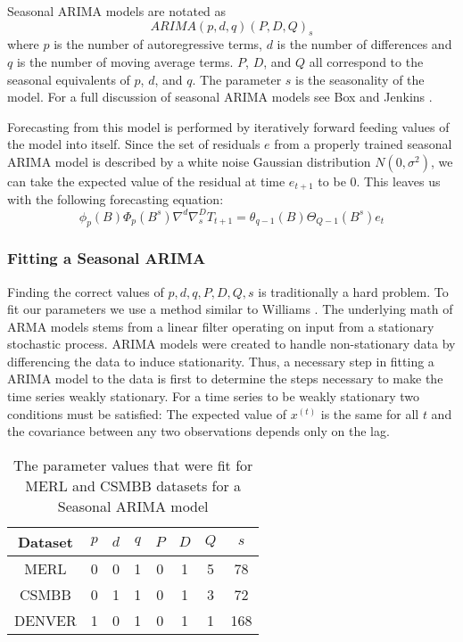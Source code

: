Seasonal ARIMA models are notated as
\begin{equation}
ARIMA(p,d,q)(P,D,Q)_{s}
\end{equation}
where $p$ is the number of autoregressive terms, $d$ is the number of differences and $q$ is the number of moving average terms.  $P$, $D$, and $Q$ all correspond to the seasonal equivalents of $p$, $d$, and $q$.  The parameter $s$ is the seasonality of the model.  For a full discussion of seasonal ARIMA models see Box and Jenkins \cite{Box2008}.

Forecasting from this model is performed by iteratively forward feeding values of the model into itself.  Since the set of residuals $e$ from a properly trained seasonal ARIMA model is described by a white noise Gaussian distribution $N(0, \sigma^{2})$, we can take the expected value of the residual at time $e_{t + 1}$ to be 0.  This leaves us with the following forecasting equation: 
\begin{equation}
\label{eq:sarima}
\phi_{p}(B)\Phi_{p}(B^{s})\nabla^{d}\nabla^{D}_{s}T_{t + 1} = \theta_{q - 1}(B)\Theta_{Q - 1}(B^{s})e_{t}
\end{equation}



\subsubsection{Fitting a Seasonal ARIMA}

Finding the correct values of $p, d, q, P, D, Q, s$ is traditionally a hard problem.  To fit our parameters we use a method similar to Williams \cite{Williams2003}.  The underlying math of ARMA models stems from a linear filter operating on input from a stationary stochastic process.  ARIMA models were created to handle non-stationary data by differencing the data to induce stationarity.  Thus, a necessary step in fitting a ARIMA model to the data is first to determine the steps necessary to make the time series weakly stationary.  For a time series to be weakly stationary two conditions must be satisfied: The expected value of $x^{(t)}$ is the same for all $t$ and the covariance between any two observations depends only on the lag.  

\begin{table}[t]
\centering
\caption{The parameter values that were fit for MERL and CSMBB datasets for a Seasonal ARIMA model}
\begin{tabular}{|c|c|c|c|c|c|c|c|} \hline
Dataset & $p$ & $d$ & $q$ & $P$ & $D$ & $Q$ & $s$\\ \hline
MERL & 0 & 0 & 1 & 0 & 1 & 5 & 78\\ \hline
CSMBB & 0 & 1 & 1 & 0 & 1 & 3 & 72\\ \hline
DENVER & 1 & 0 & 1 & 0 & 1 & 1 & 168\\ \hline
\end{tabular}
\label{fig:sarimatab}
\end{table}

